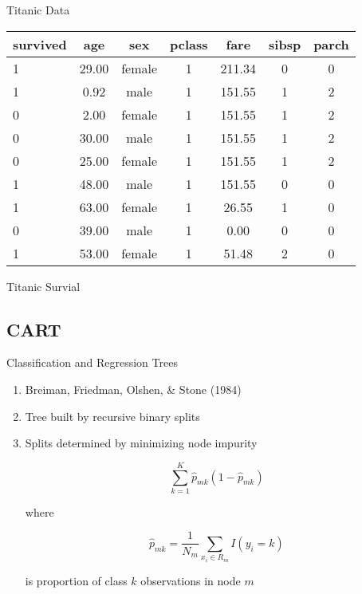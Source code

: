 \documentclass[pdf]{beamer}
\begin{document}
		\begin{frame}{Titanic Data}
		\begin{table}
		\begin{tabular}{l c c c c c c}
			\hline
			survived & age & sex & pclass & fare & sibsp & parch \\
			\hline
			1 	& 29.00 	& female	& 1	& 211.34	& 0	& 0 \\
			1 	& 0.92 	& male	& 1	& 151.55	& 1	& 2 \\
			0	& 2.00	& female	& 1	& 151.55	& 1	& 2 \\
			0 	& 30.00 	& male	& 1	& 151.55	& 1	& 2 \\
			0	& 25.00	& female	& 1	& 151.55	& 1	& 2 \\
			1 	& 48.00 	& male	& 1	& 151.55	& 0	& 0 \\
			1	& 63.00	& female	& 1	& 26.55	& 1	& 0 \\
			0	& 39.00	& male	& 1	& 0.00	& 0	& 0 \\
			1 	& 53.00 	& female	& 1	& 51.48	& 2	& 0 \\
			\hline
		\end{tabular}
		\end{table}
		\end{frame}
		
		
		\begin{frame}{Titanic Survial}
			\begin{figure}
			\end{figure}		
    		\end{frame}

	
	\subsection{CART}
	
		\begin{frame}{Classification and Regression Trees}
			\begin{enumerate}
				\item{Breiman, Friedman, Olshen, \& Stone (1984)}
				\item{Tree built by recursive binary splits}
				\item{Splits determined by minimizing node impurity \\}
				\begin{center}
					$$\sum_{k = 1}^{K} \hat{p}_{mk}(1 - \hat{p}_{mk})$$
				\end{center}
				where \\
				\begin{center}
					$$ \hat{p}_{mk} = \frac{1}{N_m} \sum_{x_i \in R_m} I(y_i = k)$$
				\end{center}
				is proportion of class $k$ observations in node $m$		
			\end{enumerate}
		\end{frame}
		
\end{document}

